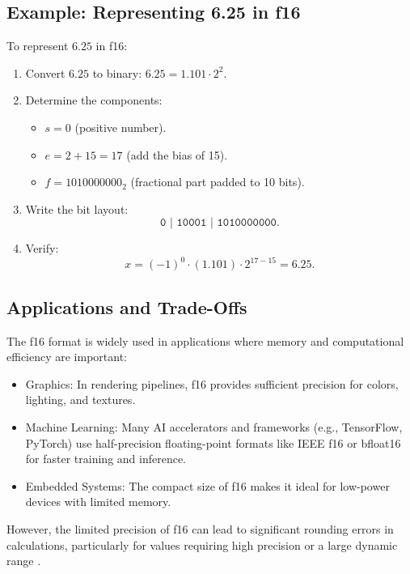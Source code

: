 \subsection{Example: Representing 6.25 in f16}

To represent \( 6.25 \) in f16:
\begin{enumerate}
    \item Convert \( 6.25 \) to binary: \( 6.25 = 1.101 \cdot 2^2 \).
    \item Determine the components:
    \begin{itemize}[noitemsep]
        \item \( s = 0 \) (positive number).
        \item \( e = 2 + 15 = 17 \) (add the bias of 15).
        \item \( f = 1010000000_2 \) (fractional part padded to 10 bits).
    \end{itemize}
    \item Write the bit layout:
    \[
    \texttt{0 | 10001 | 1010000000}.
    \]
    \item Verify:
    \[
    x = (-1)^0 \cdot (1.101) \cdot 2^{17 - 15} = 6.25.
    \]
\end{enumerate}

\subsection{Applications and Trade-Offs}
The f16 format is widely used in applications where memory and computational efficiency are important:
\begin{itemize}[noitemsep]
    \item Graphics: In rendering pipelines, f16 provides sufficient precision for colors, lighting, and textures.
    \item Machine Learning: Many AI accelerators and frameworks (e.g., TensorFlow, PyTorch) use half-precision floating-point formats like IEEE f16 or bfloat16 for faster training and inference.
    \item Embedded Systems: The compact size of f16 makes it ideal for low-power devices with limited memory.
\end{itemize}

However, the limited precision of f16 can lead to significant rounding errors in calculations, particularly for values requiring high precision or a large dynamic range \cite{goldberg1991, ieee2008}.


